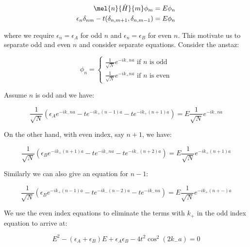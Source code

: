 \documentclass[12pt]{article}
\begin{document}
\begin{equation}
    \begin{split}
        \mel{n}{\hat{H}}{m} \phi_{m} = E \phi_{n} \\
        \epsilon_{n} \delta_{nm} - t (\delta_{n, m+1}, \delta_{n, m-1}) = E \phi_{n}
    \end{split}
\end{equation}

where we require $\epsilon_{n} = \epsilon_{A}$ for odd $n$ and $\epsilon_{n} = \epsilon_{B}$ for even $n$. This motivate us to separate odd and even $n$ and consider separate equations. Consider the anstaz:

\begin{equation}
    \phi_{n} =
    \begin{cases}
        \frac{1}{\sqrt{N}} e^{-ik_{-}na} \text{ if } n \text{ is odd} \\
        \frac{1}{\sqrt{N}} e^{-ik_{+}na} \text{ if } n \text{ is even}
    \end{cases}
\end{equation}

Assume $n$ is odd and we have:

\begin{equation}
    \frac{1}{\sqrt{N}} \left( \epsilon_{A} e^{-ik_{-}na} - t e^{-ik_{+}(n-1)a} - t e^{-ik_{+}(n+1)a} \right) = E \frac{1}{\sqrt{N}} e^{-ik_{-}na}
\end{equation}

On the other hand, with even index, say $n+1$, we have:

\begin{equation}
    \frac{1}{\sqrt{N}} \left( \epsilon_{B} e^{-ik_{+}(n+1)a} - t e^{-ik_{-}na} - t e^{-ik_{-}(n+2)a} \right) = E \frac{1}{\sqrt{N}} e^{-ik_{+}(n+1)a}
\end{equation}

Similarly we can also give an equation for $n-1$:

\begin{equation}
    \frac{1}{\sqrt{N}} \left( \epsilon_{B} e^{-ik_{+}(n-1)a} - t e^{-ik_{-}(n-2)a} - t e^{-ik_{-}na} \right) = E \frac{1}{\sqrt{N}} e^{-ik_{+}(n+-)a}
\end{equation}

We use the even index equations to eliminate the terms with $k_{+}$ in the odd index equation to arrive at:

\begin{equation}
    E^{2} - (\epsilon_{A} + \epsilon_{B})E + \epsilon_{A} \epsilon_{B} - 4t^{2} \cos^{2}{(2k_{-}a)} = 0
\end{equation}
\end{document}
